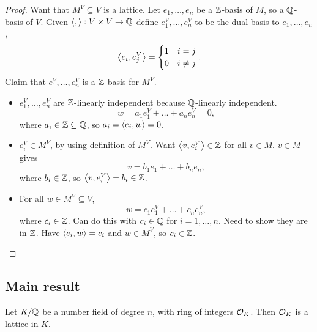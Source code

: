 \begin{proof}
Want that $ M^V \subseteq V $ is a lattice. Let $ e_1, \dots, e_n $ be a $ \mathbb{Z} $-basis of $ M $, so a $ \mathbb{Q} $-basis of $ V $. Given $ \left\langle , \right\rangle : V \times V \to \mathbb{Q} $ define $ e_1^V, \dots, e_n^V $ to be the dual basis to $ e_1, \dots, e_n $,
$$ \left\langle e_i, e_j^V \right\rangle =
\begin{cases}
1 & i = j \\
0 & i \ne j
\end{cases}.
$$
Claim that $ e_1^V, \dots, e_n^V $ is a $ \mathbb{Z} $-basis for $ M^V $.
\begin{itemize}
\item $ e_1^V, \dots, e_n^V $ are $ \mathbb{Z} $-linearly independent because $ \mathbb{Q} $-linearly independent.
$$ w = a_1e_1^V + \dots + a_ne_n^V = 0, $$
where $ a_i \in \mathbb{Z} \subseteq \mathbb{Q} $, so $ a_i = \left\langle e_i, w \right\rangle = 0 $.
\item $ e_i^V \in M^V $, by using definition of $ M^V $. Want $ \left\langle v, e_i^V \right\rangle \in \mathbb{Z} $ for all $ v \in M $. $ v \in M $ gives
$$ v = b_1e_1 + \dots + b_ne_n, $$
where $ b_i \in \mathbb{Z} $, so $ \left\langle v, e_i^V \right\rangle = b_i \in \mathbb{Z} $.
\item For all $ w \in M^V \subseteq V $,
$$ w = c_1e_1^V + \dots + c_ne_n^V, $$
where $ c_i \in \mathbb{Z} $. Can do this with $ c_i \in \mathbb{Q} $ for $ i = 1, \dots, n $. Need to show they are in $ \mathbb{Z} $. Have $ \left\langle e_i, w \right\rangle = c_i $ and $ w \in M^V $, so $ c_i \in \mathbb{Z} $.
\end{itemize}
\end{proof}

\pagebreak

\subsection{Main result}

\begin{theorem}
Let $ K / \mathbb{Q} $ be a number field of degree $ n $, with ring of integers $ \mathcal{O}_K $. Then $ \mathcal{O}_K $ is a lattice in $ K $.
\end{theorem}

